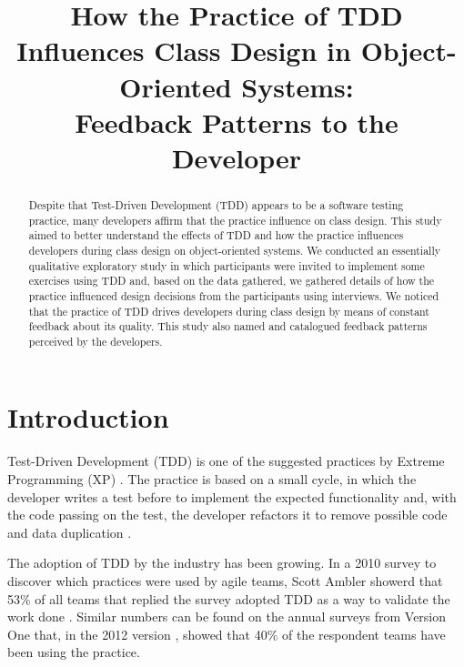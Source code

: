 \documentclass[conference]{IEEEtran}
\begin{document}
	
\title{How the Practice of TDD Influences Class Design in Object-Oriented Systems: \\Feedback Patterns to the Developer}

\author{
}

\maketitle

\begin{abstract} 
	Despite that Test-Driven Development (TDD) appears to be a software testing practice, 
	many developers affirm that the practice influence on class design. This study aimed
	to better understand the effects of TDD and how the practice influences developers
	during class design on object-oriented systems. 
	We conducted an essentially qualitative exploratory study in which participants
	were invited to implement some exercises using TDD and, based on the data gathered,
	we gathered details of how the practice influenced design decisions from the
	participants using interviews.
	We noticed that the practice of TDD drives
	developers during class design by means of constant feedback about its quality. This study
	also named and catalogued feedback patterns perceived by the developers.
\end{abstract}

\IEEEpeerreviewmaketitle

\section{Introduction}

Test-Driven Development (TDD) is one of the suggested practices
by Extreme Programming (XP) \cite{XPExplained}. The practice is based on
a small cycle, in which the developer writes a test before to implement
the expected functionality and, with the code passing on the
test, the developer refactors it to remove possible code 
and data duplication \cite{TDDByExample}.

The adoption of TDD by the industry has been growing. In a 2010 survey to discover
which practices were used by agile teams, Scott Ambler showerd that 53\% of all teams
that replied the survey adopted TDD as a way to validate the work done
\cite{wambler-survey-agile}. Similar numbers can be found on the annual surveys from
Version One that, in the 2012 version \cite{versionone-2012}, showed that
40\% of the respondent teams have been using the practice.
\end{document}

